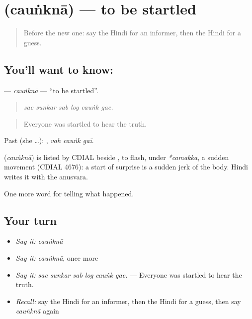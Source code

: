 \section[\texorpdfstring{\hi{चौंकना} (cauṅknā)}{चौंकना (cauṅknā)}]{ (cauṅknā) — to be startled}

\label{lesson:HI-C317-caunkna}



\begin{quote}
Before the new one: say the Hindi for an informer, then the Hindi for a guess.
\end{quote}

\subsection*{You'll want to know: }
\textbf{} — \emph{cauṅknā} — \textquotedblleft{}to be startled\textquotedblright{}.

\begin{quote}
     
\end{quote}

\begin{quote}
\emph{sac sunkar sab log cauṅk gae.}
\end{quote}

\begin{quote}
Everyone was startled to hear the truth.
\end{quote}

Past (she …):   , \emph{vah cauṅk gaī}.

\begin{cousinweb}
\textbf{} (\emph{cauṅknā}) is listed by CDIAL beside \textbf{}, to flash, under \emph{*camakka}, a sudden movement (CDIAL 4676): a start of surprise is a sudden jerk of the body. Hindi writes it with the anusvara.
\end{cousinweb}

\begin{grammarlens}[title={What you've built}]
One more word for telling what happened.
\end{grammarlens}

\subsection*{Your turn}
\begin{itemize}
\raggedright
  \item \emph{Say it:} \emph{cauṅknā}
  \item \emph{Say it:} \emph{cauṅknā}, once more
  \item \emph{Say it:} \emph{sac sunkar sab log cauṅk gae.} — Everyone was startled to hear the truth.
  \item \emph{Recall:} say the Hindi for an informer, then the Hindi for a guess, then say \emph{cauṅknā} again
\end{itemize}

